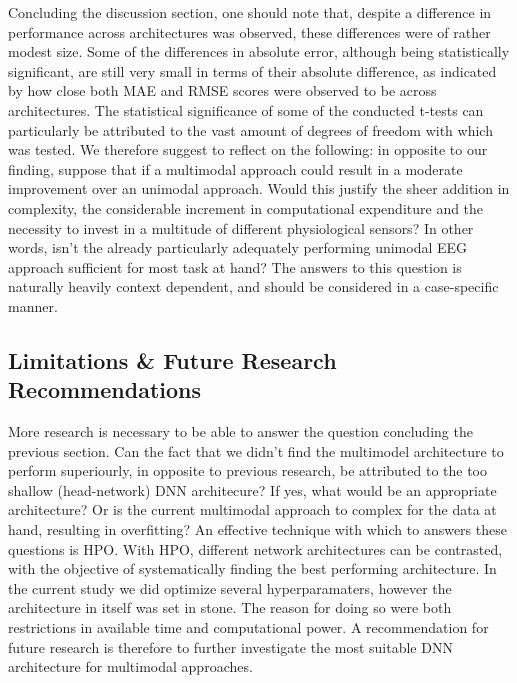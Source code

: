 \documentclass[12pt]{article}
\begin{document}
Concluding the discussion section, one should note that, despite a difference in performance across architectures was observed,  these differences were of rather modest size. Some of the differences in absolute error, although being statistically significant, are still very small in terms of their absolute difference, as indicated by how close both MAE and RMSE scores were observed to be across architectures. The statistical significance of some of the conducted t-tests can particularly be attributed to the vast amount of degrees of freedom with which was tested. We therefore suggest to reflect on the following: in opposite to our finding, suppose that if a multimodal approach could result in a moderate improvement over an unimodal approach. Would this justify the sheer addition in complexity,  the considerable increment in computational expenditure and the necessity to invest in a multitude of different physiological sensors? In other words, isn't the already particularly adequately performing unimodal EEG approach sufficient for most task at hand? The answers to this question is naturally heavily context dependent, and should be considered in a case-specific manner.  

\subsection{Limitations \& Future Research Recommendations}
More research is necessary to be able to answer the question concluding the previous section. Can the fact that we didn't find the multimodel architecture to perform superiourly,  in opposite to previous research, be attributed to the too shallow (head-network) DNN architecure? If yes,  what would be an appropriate architecture? Or is the current multimodal approach to complex for the data at hand, resulting in overfitting? An effective technique with which to answers these questions is HPO.  With HPO, different network architectures can be contrasted, with the objective of systematically finding the best performing architecture. In the current study we did optimize several hyperparamaters, however the architecture in itself was set in stone.  The reason for doing so were both restrictions in available time and computational power. A recommendation for future research is therefore to further investigate the most suitable DNN architecture for multimodal approaches. 
\end{document}
